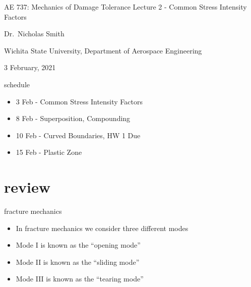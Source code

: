 \documentclass[
  letterpaper,
  ignorenonframetext,
  aspectratio=43,
  handout,
  12pt]{beamer}
\author{}
\date{}
\providecommand{\tightlist}{%
  \setlength{\itemsep}{0pt}\setlength{\parskip}{0pt}}
\providecommand{\tightlist}{%
\setlength{\itemsep}{0pt}\setlength{\parskip}{0pt}}
\begin{document}
\begin{frame}{AE 737: Mechanics of Damage Tolerance}
\protect\hypertarget{ae-737-mechanics-of-damage-tolerance}{}
Lecture 2 - Common Stress Intensity Factors

Dr.~Nicholas Smith

Wichita State University, Department of Aerospace Engineering

3 February, 2021
\end{frame}

\begin{frame}{schedule}
\protect\hypertarget{schedule}{}
\begin{itemize}
\tightlist
\item
  3 Feb - Common Stress Intensity Factors
\item
  8 Feb - Superposition, Compounding
\item
  10 Feb - Curved Boundaries, HW 1 Due
\item
  15 Feb - Plastic Zone
\end{itemize}
\end{frame}

\hypertarget{review}{%
\section{review}\label{review}}

\begin{frame}{fracture mechanics}
\protect\hypertarget{fracture-mechanics}{}
\begin{itemize}
\tightlist
\item
  In fracture mechanics we consider three different modes
\item
  Mode I is known as the ``opening mode''
\item
  Mode II is known as the ``sliding mode''
\item
  Mode III is known as the ``tearing mode''
\end{itemize}
\end{frame}
\end{document}
